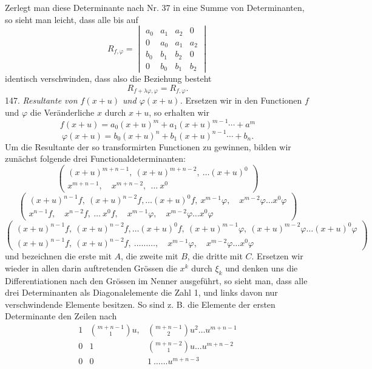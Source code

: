 \documentclass[11pt]{article}
\providecommand{\weberpage}[1]{}
\begin{document}
\weberpage{152}
Zerlegt man diese Determinante nach Nr. 37 in eine Summe von
Determinanten, so sieht man leicht, dass alle bis auf
\[
R_{f,\varphi} = \begin{vmatrix}
a_0 & a_1 & a_2 & 0\\
0 & a_0 & a_1 & a_2\\
b_0 & b_1 & b_2 & 0\\
0 & b_0 & b_1 & b_2
\end{vmatrix}
\]
identisch verschwinden, dass also die Beziehung besteht
\[
R_{f+\lambda\varphi,\varphi} = R_{f,\varphi}.
\]
147. \textit{Resultante von $f(x+u)$ und $\varphi(x+u)$.} Ersetzen wir
in den Functionen $f$ und $\varphi$ die Ver\"anderliche $x$ durch $x+u$,
so erhalten wir
\[
f(x+u) = a_0(x+u)^m + a_1(x+u)^{m-1}\cdots + a^m
\]
\[
\varphi(x+u) = b_0(x+u)^n + b_1(x+u)^{n-1}\cdots + b_n.
\]
Um die Resultante der so transformirten Functionen zu gewinnen, bilden
wir zun\"achst folgende drei Functionaldeterminanten:
\[
\left(\begin{array}{l}
(x+u)^{m+n-1},\ (x+u)^{m+n-2},\ \ldots (x+u)^0\\[2pt]
x^{m+n-1},\quad x^{m+n-2},\ \ \ldots\ x^0
\end{array}\right)
\]
\[
\left(\begin{array}{l}
(x+u)^{n-1}f,\ (x+u)^{n-2}f,\ldots(x+u)^0f,\ x^{m-1}\varphi,\quad x^{m-2}\varphi\ldots x^0\varphi\\[2pt]
x^{n-1}f,\quad x^{n-2}f,\ \ldots\ x^0f,\quad x^{m-1}\varphi,\quad x^{m-2}\varphi\ldots x^0\varphi
\end{array}\right)
\]
\[
\left(\begin{array}{l}
(x+u)^{n-1}f,\ (x+u)^{n-2}f,\ldots(x+u)^0f,\ (x+u)^{m-1}\varphi,\ (x+u)^{m-2}\varphi\ldots(x+u)^0\varphi\\[2pt]
(x+u)^{n-1}f,\ (x+u)^{n-2}f,\ \ldots\ldots\ldots,\quad x^{m-1}\varphi,\quad x^{m-2}\varphi\ldots x^0\varphi
\end{array}\right)
\]
und bezeichnen die erste mit $A$, die zweite mit $B$, die dritte mit
$C$. Ersetzen wir wieder in allen darin auftretenden Gr\"ossen die
$x^k$ durch $\xi_k$ und denken uns die Differentiationen nach den
Gr\"ossen im Nenner ausgef\"uhrt, so sieht man, dass alle drei
Determinanten als Diagonalelemente die Zahl 1, und links davon nur
verschwindende Elemente besitzen. So sind z. B. die Elemente der ersten
Determinante den Zeilen nach
\[
\begin{array}{lll}
1 & \binom{m+n-1}{1}u, & \binom{m+n-1}{2}u^2\ldots u^{m+n-1}\\
0 & 1 & \binom{m+n-2}{1}u\ldots u^{m+n-2}\\
0 & 0 & 1\ \ldots\ldots u^{m+n-3}
\end{array}
\]
\end{document}

